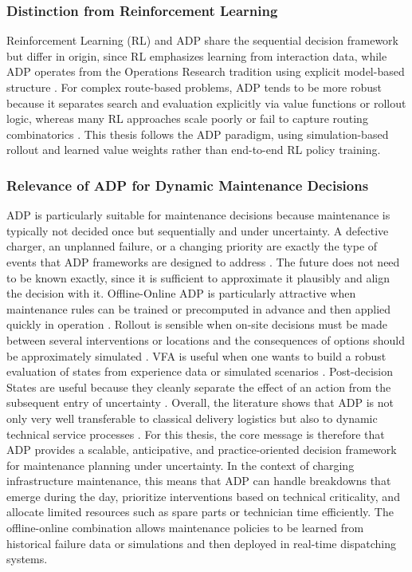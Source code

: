 \documentclass[12pt,oneside]{article}
\begin{document}
\subsubsection{Distinction from Reinforcement Learning}
Reinforcement Learning (RL) and ADP share the sequential decision framework but differ in origin, since RL emphasizes learning from interaction data, while ADP operates from the Operations Research tradition using explicit model-based structure \citep{mardevsic2023review}. For complex route-based problems, ADP tends to be more robust because it separates search and evaluation explicitly via value functions or rollout logic, whereas many RL approaches scale poorly or fail to capture routing combinatorics \citep{hildebrandt2023opportunities}. This thesis follows the ADP paradigm, using simulation-based rollout and learned value weights rather than end-to-end RL policy training.


\subsubsection{Relevance of ADP for Dynamic Maintenance Decisions}
ADP is particularly suitable for maintenance decisions because maintenance is typically not decided once but sequentially and under uncertainty. A defective charger, an unplanned failure, or a changing priority are exactly the type of events that ADP frameworks are designed to address \citep{ulmer2018budgeting, ulmer2019offline}.
The future does not need to be known exactly, since it is sufficient to approximate it plausibly and align the decision with it. Offline-Online ADP is particularly attractive when maintenance rules can be trained or precomputed in advance and then applied quickly in operation \citep{ulmer2019offline}.
Rollout is sensible when on-site decisions must be made between several interventions or locations and the consequences of options should be approximately simulated \citep{zou2018look}. VFA is useful when one wants to build a robust evaluation of states from experience data or simulated scenarios \citep{ulmer2020horizontal}. Post-decision States are useful because they cleanly separate the effect of an action from the subsequent entry of uncertainty \citep{anuar2022multi}.
Overall, the literature shows that ADP is not only very well transferable to classical delivery logistics but also to dynamic technical service processes \citep{mardevsic2023review}. For this thesis, the core message is therefore that ADP provides a scalable, anticipative, and practice-oriented decision framework for maintenance planning under uncertainty.
In the context of charging infrastructure maintenance, this means that ADP can handle breakdowns that emerge during the day, prioritize interventions based on technical criticality, and allocate limited resources such as spare parts or technician time efficiently. The offline-online combination allows maintenance policies to be learned from historical failure data or simulations and then deployed in real-time dispatching systems.
\end{document}
